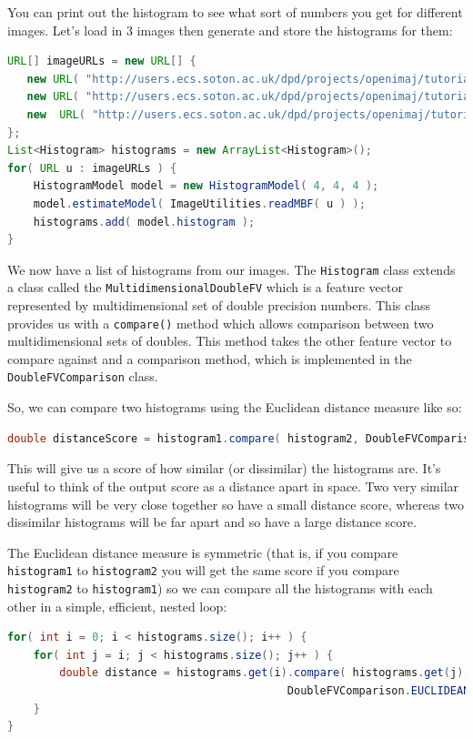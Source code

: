\documentclass[10pt,a4paper,twoside,extrafontsizes]{memoir}
\begin{document}
You can print out the histogram to see what sort of numbers you get for different images. 
Let's load in 3 images then generate and store the histograms for them:
\begin{lstlisting}[language=java]
URL[] imageURLs = new URL[] {
   new URL( "http://users.ecs.soton.ac.uk/dpd/projects/openimaj/tutorial/hist1.jpg" ),
   new URL( "http://users.ecs.soton.ac.uk/dpd/projects/openimaj/tutorial/hist2.jpg" ), 
   new  URL( "http://users.ecs.soton.ac.uk/dpd/projects/openimaj/tutorial/hist3.jpg" ) 
};
List<Histogram> histograms = new ArrayList<Histogram>();
for( URL u : imageURLs ) {
    HistogramModel model = new HistogramModel( 4, 4, 4 );
    model.estimateModel( ImageUtilities.readMBF( u ) );
    histograms.add( model.histogram );
}
\end{lstlisting}
We now have a list of histograms from our images.  The \verb+Histogram+ class extends a 
class called the \verb+MultidimensionalDoubleFV+ which is a feature vector represented 
by multidimensional set of double precision numbers.  This class provides us with a 
\verb+compare()+ method which allows comparison between two multidimensional sets of 
doubles. This method takes the other feature vector to compare against and a comparison 
method, which is implemented in the \verb+DoubleFVComparison+ class.

So, we can compare two histograms using the Euclidean distance measure like so:
\begin{lstlisting}[language=java]
double distanceScore = histogram1.compare( histogram2, DoubleFVComparison.EUCLIDEAN );
\end{lstlisting}
This will give us a score of how similar (or dissimilar) the histograms are. It's useful
to think of the output score as a distance apart in space. Two very similar histograms 
will be very close together so have a small distance score, whereas two dissimilar 
histograms will be far apart and so have a large distance score.

The Euclidean distance measure is symmetric (that is, if you compare \verb+histogram1+ to 
\verb+histogram2+ you will get the same score if you compare \verb+histogram2+ to 
\verb+histogram1+) so we can compare all the histograms with each other in a simple, 
efficient, nested loop:
\begin{lstlisting}[language=java]
for( int i = 0; i < histograms.size(); i++ ) {
    for( int j = i; j < histograms.size(); j++ ) {
        double distance = histograms.get(i).compare( histograms.get(j), 
                                           DoubleFVComparison.EUCLIDEAN );
    }
}
\end{lstlisting}
\end{document}
